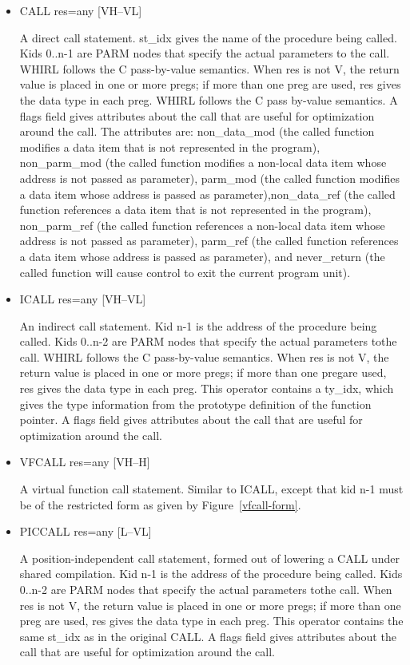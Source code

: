 \documentclass{article}
\begin{document}
\begin{itemize}

\item  CALL res=any \hfill [VH--VL]

A direct call statement. st\_idx gives the name of the procedure
being called. Kids 0..n-1 are
PARM nodes that specify the actual parameters to the call. WHIRL
follows the C pass-by-value semantics. When res is not V, 
the return value is placed in one or more pregs; if more than
one preg are used, res gives the data type in each preg. WHIRL
follows the C pass by-value semantics. A flags field gives attributes
about the call that are useful for optimization around the call.
The attributes are: non\_data\_mod (the called function modifies a
data item that is not represented in the program), non\_parm\_mod (the
called function modifies a non-local data item whose address is
not passed as parameter), parm\_mod (the called
function modifies a data item whose address is passed as
parameter),non\_data\_ref (the called function references a data item
that is not represented in the program), non\_parm\_ref (the called
function references a non-local data item whose address is not passed
as parameter), parm\_ref (the called function references a data item
whose address is passed as parameter), and never\_return (the called
function will cause control to exit the current program unit).

\item  ICALL res=any \hfill [VH--VL]

An indirect call statement. Kid n-1 is the address of the procedure
being called. Kids 0..n-2 are
PARM nodes that specify the actual parameters tothe call. WHIRL
follows the C pass-by-value semantics. When res is not
V, the return value is placed in one or more pregs; if more than
one pregare used, res gives the data type in each preg. This operator
contains a ty\_idx, which gives the type information from the
prototype definition of the function pointer. A flags field gives
attributes about the call that are useful for optimization around
the call. 

\item  VFCALL res=any \hfill [VH--H]

A virtual function call statement. Similar to ICALL, except that
kid n-1 must be of the restricted form as given by
Figure~\ref{vfcall-form}.

\item  PICCALL res=any [L--VL]

A position-independent call statement, formed out of lowering a
CALL under shared compilation. Kid n-1 is the address of the
procedure being
called. Kids 0..n-2 are PARM nodes that specify the actual parameters
tothe call. When res is not V, the return value is placed in one
or more pregs; if more than one preg are used, res gives the data type in
each preg. This operator contains the same st\_idx as in the original
CALL. A flags field gives attributes about the call that are useful
for optimization around the call. 


\end{itemize}
\end{document}

